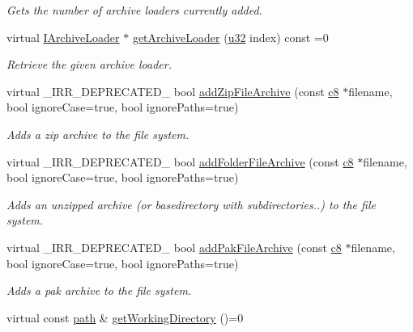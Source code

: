 \begin{DoxyCompactItemize}
\begin{DoxyCompactList}\small\item\em Gets the number of archive loaders currently added. \end{DoxyCompactList}\item 
virtual \hyperlink{classirr_1_1io_1_1IArchiveLoader}{I\+Archive\+Loader} $\ast$ \hyperlink{classirr_1_1io_1_1IFileSystem_af7265859f3cd85f1c097ca3eead10979}{get\+Archive\+Loader} (\hyperlink{namespaceirr_a0416a53257075833e7002efd0a18e804}{u32} index) const  =0
\begin{DoxyCompactList}\small\item\em Retrieve the given archive loader. \end{DoxyCompactList}\item 
virtual \+\_\+\+I\+R\+R\+\_\+\+D\+E\+P\+R\+E\+C\+A\+T\+E\+D\+\_\+ bool \hyperlink{classirr_1_1io_1_1IFileSystem_aef11ff9b5c171d7b3a99d8a79b71f2b3}{add\+Zip\+File\+Archive} (const \hyperlink{namespaceirr_a9395eaea339bcb546b319e9c96bf7410}{c8} $\ast$filename, bool ignore\+Case=true, bool ignore\+Paths=true)
\begin{DoxyCompactList}\small\item\em Adds a zip archive to the file system. \end{DoxyCompactList}\item 
virtual \+\_\+\+I\+R\+R\+\_\+\+D\+E\+P\+R\+E\+C\+A\+T\+E\+D\+\_\+ bool \hyperlink{classirr_1_1io_1_1IFileSystem_a7b5235a1473ff67d97f1487211762723}{add\+Folder\+File\+Archive} (const \hyperlink{namespaceirr_a9395eaea339bcb546b319e9c96bf7410}{c8} $\ast$filename, bool ignore\+Case=true, bool ignore\+Paths=true)
\begin{DoxyCompactList}\small\item\em Adds an unzipped archive (or basedirectory with subdirectories..) to the file system. \end{DoxyCompactList}\item 
virtual \+\_\+\+I\+R\+R\+\_\+\+D\+E\+P\+R\+E\+C\+A\+T\+E\+D\+\_\+ bool \hyperlink{classirr_1_1io_1_1IFileSystem_a5ade21d59a80b16965d57d1977ad6cc4}{add\+Pak\+File\+Archive} (const \hyperlink{namespaceirr_a9395eaea339bcb546b319e9c96bf7410}{c8} $\ast$filename, bool ignore\+Case=true, bool ignore\+Paths=true)
\begin{DoxyCompactList}\small\item\em Adds a pak archive to the file system. \end{DoxyCompactList}\item 
virtual const \hyperlink{namespaceirr_1_1io_ab1bdc45edb3f94d8319c02bc0f840ee1}{path} \& \hyperlink{classirr_1_1io_1_1IFileSystem_acbf7342afa6e2fc9583db3e521e66e61}{get\+Working\+Directory} ()=0

\end{DoxyCompactItemize}
